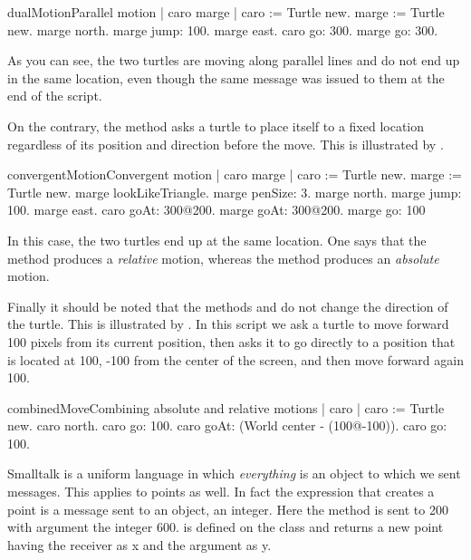 \begin{scriptfig}{dualMotion}{Parallel motion}
\label{scr:dualMotion}
| caro marge |
caro := Turtle new.
marge := Turtle new.
marge north.
marge jump: 100.
marge east.
caro go: 300.
marge go: 300.
\end{scriptfig}

As you can see, the two turtles are moving along parallel lines and
do not end up in the same location, even though the same message
 was issued to them at the end of the script.

On the contrary, the method \lgoat asks a turtle to place itself
to a fixed location regardless of its position and direction
before the move. This is illustrated by
.

\begin{scriptfig}{convergentMotion}{Convergent motion}
\label{scr:convergentMotion}
| caro marge |
caro := Turtle new.
marge := Turtle new.
marge lookLikeTriangle.
marge penSize: 3.
marge north.
marge jump: 100.
marge east.
caro goAt: 300@200.
marge goAt: 300@200.
marge go: 100 
\end{scriptfig}

In this case, the two turtles end up at the same location. One
says that the method \go produces a \emph{relative}
motion, whereas the method \goat produces an
\emph{absolute} motion.

Finally it should be noted that the methods \go and \goat do not
change the direction of the turtle. This is illustrated by
. In this script we ask a turtle to move forward 100 pixels from its current position, then 
asks it to go directly to a position that is located at 100, -100 from the center of the screen, and then move forward again 100.

\begin{scriptfig}{combinedMove}{Combining absolute and relative motions}
\label{scr:combinedMove}
| caro |
caro := Turtle new.
caro north.
caro go: 100.
caro goAt: (World center - (100@-100)).
caro go: 100.
\end{scriptfig}



\begin{spicy}
Smalltalk is a uniform language in which {\em everything} is an object to which we sent messages. This applies to points as well. 
 In fact the expression  that creates a point is a message sent to an
object, an integer.  Here the method  is sent to 200 with argument the integer 600.  is defined on the class 
and returns a new point having the receiver as x and the argument as y.
\end{spicy}



